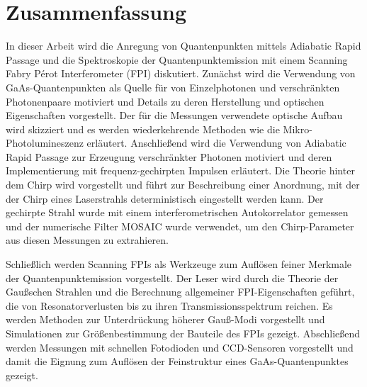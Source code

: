 
\chapter*{Zusammenfassung}
\label{cha:zusammenfassung}


In dieser Arbeit wird die Anregung von Quantenpunkten mittels Adiabatic Rapid Passage und die Spektroskopie der Quantenpunktemission mit einem Scanning Fabry Pérot Interferometer (FPI) diskutiert.
Zunächst wird die Verwendung von GaAs-Quantenpunkten als Quelle für von Einzelphotonen und verschränkten Photonenpaare motiviert und Details zu deren Herstellung und optischen Eigenschaften vorgestellt.
Der für die Messungen verwendete optische Aufbau wird skizziert und es werden wiederkehrende Methoden wie die Mikro-Photolumineszenz erläutert.
Anschließend wird die Verwendung von Adiabatic Rapid Passage zur Erzeugung verschränkter Photonen motiviert und deren Implementierung mit frequenz-gechirpten Impulsen erläutert.
Die Theorie hinter dem Chirp wird vorgestellt und führt zur Beschreibung einer Anordnung, mit der der Chirp eines Laserstrahls deterministisch eingestellt werden kann.
Der gechirpte Strahl wurde mit einem interferometrischen Autokorrelator gemessen und der numerische Filter MOSAIC wurde verwendet, um den Chirp-Parameter aus diesen Messungen zu extrahieren.

Schließlich werden Scanning FPIs als Werkzeuge zum Auflösen feiner Merkmale der Quantenpunktemission vorgestellt.
Der Leser wird durch die Theorie der Gaußschen Strahlen und die Berechnung allgemeiner FPI-Eigenschaften geführt, die von Resonatorverlusten bis zu ihren Transmissionsspektrum reichen.
Es werden Methoden zur Unterdrückung höherer Gauß-Modi vorgestellt und Simulationen zur Größenbestimmung der Bauteile des FPIs gezeigt.
Abschließend werden Messungen mit schnellen Fotodioden und CCD-Sensoren vorgestellt und damit die Eignung zum Auflösen der Feinstruktur eines GaAs-Quantenpunktes gezeigt.

